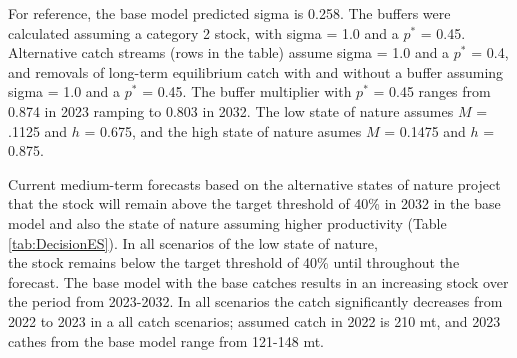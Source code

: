\documentclass[11pt,
  english,
  a4paper,
]{article}
\begin{document}
For reference, the base model predicted sigma is 0.258. The buffers were calculated assuming a category 2 stock, with sigma = 1.0 and a {\(p^*\)\leavevmode\tagmcend\tagstructend} = 0.45. Alternative catch streams (rows in the table) assume sigma = 1.0 and a {\(p^*\)\leavevmode\tagmcend\tagstructend} = 0.4, and removals of long-term equilibrium catch with and without a buffer assuming sigma = 1.0 and a {\(p^*\)\leavevmode\tagmcend\tagstructend} = 0.45. The buffer multiplier with {\(p^*\)\leavevmode\tagmcend\tagstructend} = 0.45 ranges from 0.874 in 2023 ramping to 0.803 in 2032. The low state of nature assumes {\(M\)\leavevmode\tagmcend\tagstructend} = .1125 and {\(h\)\leavevmode\tagmcend\tagstructend} = 0.675, and the high state of nature asumes {\(M\)\leavevmode\tagmcend\tagstructend} = 0.1475 and {\(h\)\leavevmode\tagmcend\tagstructend} = 0.875.

Current medium-term forecasts based on the alternative states of nature project that the stock will remain above the target threshold of 40\% in 2032 in the base model and also the state of nature assuming higher productivity (Table \ref{tab:DecisionES}). In all scenarios of the low state of nature,\\
the stock remains below the target threshold of 40\% until throughout the forecast. The base model with the base catches results in an increasing stock over the period from 2023-2032. In all scenarios the catch significantly decreases from 2022 to 2023 in a all catch scenarios; assumed catch in 2022 is 210 mt, and 2023 cathes from the base model range from 121-148 mt.
\end{document}
